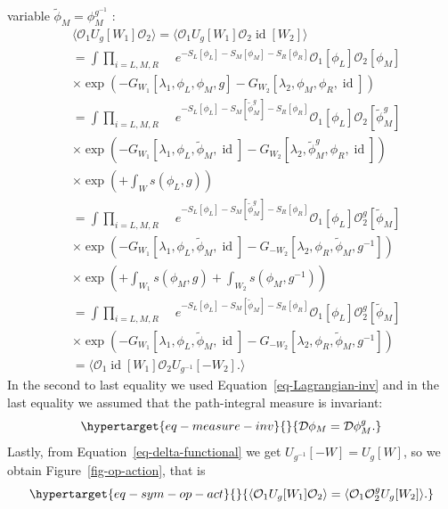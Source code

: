 \documentclass[
  letterpaper,
  DIV=11,
  numbers=noendperiod]{scrreport}
\DeclareMathOperator{\id}{id}
\begin{document}
variable \(\widetilde{\phi}_M = \phi_M^{g^{-1}}\) : \[
\begin{aligned}
    &\langle \mathcal{O}_1 U_g[W_1] \mathcal{O}_2 \rangle = \langle \mathcal{O}_1 U_g[W_1] \mathcal{O}_2 \id[W_2] \rangle \\
     &= \int \prod_{i=L,M,R}\mathop{\mathcal{D}^{M_i}\phi_i} \mathop{\prod_{a=1,2}\mathcal{D}^{W_a} \lambda_a} e^{-S_L[\phi_L]-S_M[\phi_M]-S_R[\phi_R]}\mathcal{O}_1[\phi_L] \mathcal{O}_2[\phi_M]
     \\ 
     &\times \exp\left(-G_{W_1}[\lambda_1,\phi_L,\phi_M,g]-G_{W_2}[\lambda_2,\phi_M,\phi_R,\id]\right)\\
     &= \int \prod_{i=L,M,R}\mathop{\mathcal{D}^{M_i}\phi_i} \mathop{\prod_{a=1,2}\mathcal{D}^{W_a}\lambda_a} e^{-S_L[\phi_L]-S_M[\widetilde\phi_M^g]-S_R[\phi_R]}\mathcal{O}_1[\phi_L] \mathcal{O}_2[\widetilde\phi_M^g]
     \\ 
     &\times \exp\left(-G_{W_1}[\lambda_1,\phi_L,\widetilde\phi_M,\id]-G_{W_2}[\lambda_2,\widetilde{\phi}_M^g,\phi_R,\id]\right)\\ 
     &\times \exp\left( + \int_W s(\phi_L,g) \right)\\ 
     &= \int \prod_{i=L,M,R}\mathop{\mathcal{D}^{M_i}\phi_i} \mathop{\prod_{a=1,2}\mathcal{D}^{W_a}\lambda_a} e^{-S_L[\phi_L]-S_M[\widetilde\phi_M^g]-S_R[\phi_R]}\mathcal{O}_1[\phi_L] \mathcal{O}_2^g[\widetilde\phi_M]
     \\ 
     &\times \exp\left(-G_{W_1}[\lambda_1,\phi_L,\widetilde\phi_M,\id]-G_{-W_2}[\lambda_2,\phi_R,\widetilde{\phi}_M,g^{-1}]\right)\\ 
     &\times \exp\left( + \int_{W_1} s(\phi_M,g) + \int_{W_2} s(\phi_M,g^{-1})  \right)\\
     &= \int \prod_{i=L,M,R}\mathop{\mathcal{D}^{M_i}\phi_i} \mathop{\prod_{a=1,2}\mathcal{D}^{W_a}\lambda_a} e^{-S_L[\phi_L]-S_M[\widetilde\phi_M]-S_R[\phi_R]}\mathcal{O}_1[\phi_L] \mathcal{O}_2^g[\widetilde\phi_M]
     \\ 
     &\times \exp\left(-G_{W_1}[\lambda_1,\phi_L,\widetilde\phi_M,\id]-G_{-W_2}[\lambda_2,\phi_R,\widetilde{\phi}_M,g^{-1}]\right)\\
     &= \langle \mathcal{O}_1 \id[W_1] \mathcal{O}_2 U_{g^{-1}}[-W_2]. \rangle
\end{aligned}
\] In the second to last equality we used
Equation~\ref{eq-Lagrangian-inv} and in the last equality we assumed
that the path-integral measure is invariant:
\begin{equation}\protect\hypertarget{eq-measure-inv}{}{\mathcal{D}\phi_M = \mathcal{D}\phi_M^g.
}\label{eq-measure-inv}\end{equation} Lastly, from
Equation~\ref{eq-delta-functional} we get \(U_{g^{-1}}[-W] = U_g[W]\),
so we obtain Figure~\ref{fig-op-action}, that is
\begin{equation}\protect\hypertarget{eq-sym-op-act}{}{
\langle \mathcal{O}_1 U_g[W_1] \mathcal{O}_2 \rangle = \langle \mathcal{O}_1 \mathcal{O}_2^g U_g[W_2] \rangle.
}\label{eq-sym-op-act}\end{equation}
\end{document}
